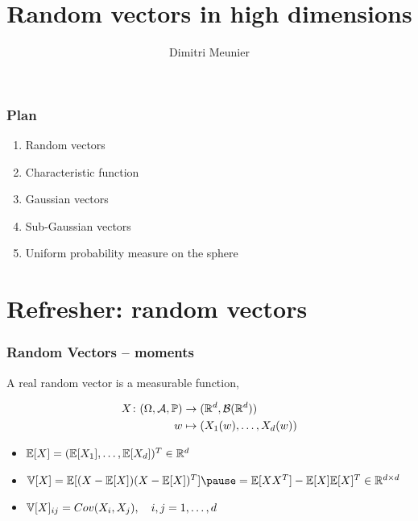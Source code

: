 \documentclass[handout, 10pt]{beamer} %
\title{Random vectors in high dimensions}
\author{Dimitri Meunier}
\institute{IIT}
\begin{document}
\maketitle

\begin{frame}
  \frametitle{Plan}

  \begin{enumerate}
  \item Random vectors
    \pause
  \item Characteristic function
    \pause
  \item Gaussian vectors
    \pause
  \item Sub-Gaussian vectors
    \pause
  \item Uniform probability measure on the sphere
  \end{enumerate}
\end{frame}



  \section{Refresher: random vectors}

  \begin{frame}
    \frametitle{Random Vectors -- moments}

    A real random vector is a measurable function,

    \begin{align*}
      X \colon (\Omega,\mathcal{A},\mathbb{P}) &\to  (\mathbb{R}^{d},\mathcal{B}(\mathbb{R}^{d}))\\
      w &\mapsto (X_1(w), \ldots, X_d(w))
    \end{align*}

    \pause

    \begin{itemize}
    \item $\mathbb{E}[X] = (\mathbb{E}[X_1], \ldots, \mathbb{E}[X_d])^T \in \mathbb{R}^{d}$
      \pause
      
    \item $\V[X] = \E[(X-\E[X])(X-\E[X])^T] \pause =  \E[XX^T] - \E[X]\E[X]^T \in
      \R^{d\times d}$
      \pause
    \item $\mathbb{V}[X]_{ij} = Cov(X_i,X_j), \quad  i,j=1,\ldots,d$        
    \end{itemize}
  \end{frame}

\end{document}
